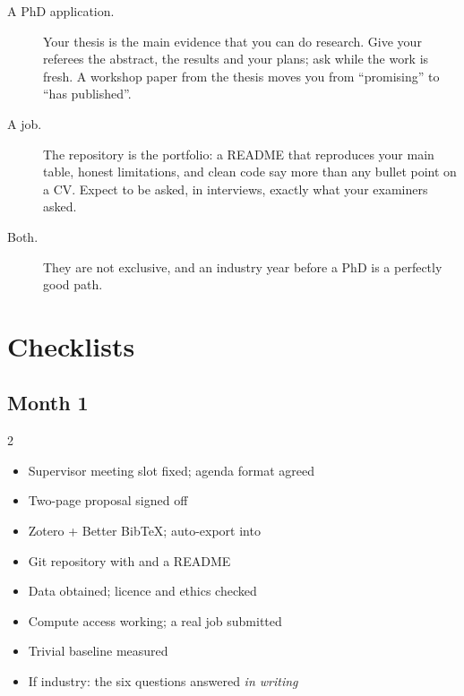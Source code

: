 \documentclass[11pt,a4paper]{article}
\begin{document}
\begin{description}
  \item[A PhD application.] Your thesis is the main evidence that you can do
        research. Give your referees the abstract, the results and your plans;
        ask while the work is fresh. A workshop paper from the thesis moves
        you from ``promising'' to ``has published''.
  \item[A job.] The repository is the portfolio: a README that reproduces your
        main table, honest limitations, and clean code say more than any
        bullet point on a CV. Expect to be asked, in interviews, exactly what
        your examiners asked.
  \item[Both.] They are not exclusive, and an industry year before a PhD is
        a perfectly good path.
\end{description}

\section{Checklists}

\subsection*{Month 1}
\begin{multicols}{2}
\begin{itemize}
  \item Supervisor meeting slot fixed; agenda format agreed
  \item Two-page proposal signed off
  \item Zotero + Better BibTeX; auto-export into 
  \item Git repository with  and a README
  \item Data obtained; licence and ethics checked
  \item Compute access working; a real job submitted
  \item Trivial baseline measured
  \item If industry: the six questions answered \emph{in writing}
\end{itemize}
\end{multicols}
\end{document}
